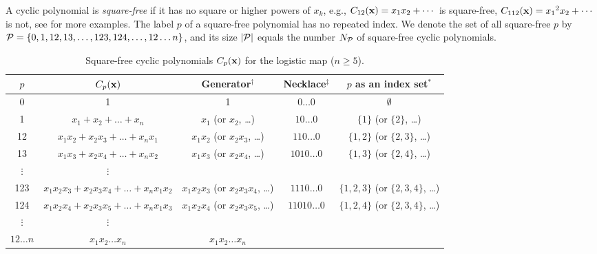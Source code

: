 \documentclass[twocolumn]{revtex4-1}
\begin{document}
A cyclic polynomial is \emph{square-free}
  if it has no square or higher powers of $x_k$,
e.g., $C_{12}(\mathbf{x}) = x_1 x_2 + \cdots$ is square-free,
  $C_{112}(\mathbf{x}) = {x_1}^2 x_2 + \cdots$ is not,
  see  for more examples.
The label $p$ of a square-free polynomial
  has no repeated index.
We denote the set of all square-free $p$ by
$\mathcal P = \{0, 1, 12, 13, \ldots, 123, 124, \ldots, 12\dots n\}$,
and its size $|\mathcal P|$ equals the number $N_\mathcal P$ of
  square-free cyclic polynomials.


\begin{table*}[t]\footnotesize
\caption{Square-free cyclic polynomials $C_p(\mathbf{x})$ for the logistic map ($n \ge 5$).}
\begin{center}
\begin{tabular}{c c c c c}
\hline
$p$ & $C_p(\mathbf{x})$ & Generator$^\dagger$ & Necklace$^\ddagger$ & $p$ as an index set$^*$\\
\hline
0             & 1 & 1 & $0\ldots0$ & $\emptyset$ \\
1             & $x_1 + x_2 + \dots + x_n$
              & $x_1$ (or $x_2$, \ldots)
              & $10\ldots0$
              & $\{1\}$ (or $\{2\}$, \ldots) \\
12            & $x_1 x_2 + x_2 x_3 + \dots + x_n x_1$
              & $x_1 x_2$ (or $x_2 x_3$, \ldots)
              & $110\ldots0$
              & $\{1, 2\}$ (or $\{2, 3\}$, \ldots) \\
13            & $x_1 x_3 + x_2 x_4 + \dots + x_n x_2$
              & $x_1 x_3$ (or $x_2 x_4$, \ldots)
              & $1010\ldots0$
              & $\{1, 3\}$ (or $\{2, 4\}$, \ldots) \\
$\vdots$      & $\vdots$ \\
123           & \hspace{1mm}$x_1 x_2 x_3 + x_2 x_3 x_4 + \dots + x_n x_1 x_2$\hspace{1mm}
              & \hspace{1mm}$x_1 x_2 x_3$ (or $x_2 x_3 x_4$, \ldots)\hspace{1mm}
              & $1110\ldots0$
              & $\{1, 2, 3\}$ (or $\{2, 3, 4\}$, \ldots) \\
124           & $x_1 x_2 x_4 + x_2 x_3 x_5 + \dots + x_n x_1 x_3$
              & $x_1 x_2 x_4$ (or $x_2 x_3 x_5$, \ldots)
              & $11010\ldots0$
              & $\{1, 2, 4\}$ (or $\{2, 3, 4\}$, \ldots) \\
$\vdots$      & $\vdots$ \\
$12\dots n$  & $x_1 x_2 \dots x_n$
              & $x_1 x_2 \dots x_n$

\end{tabular}
\end{center}
\end{table*}
\end{document}

